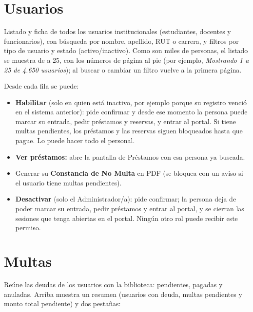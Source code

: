\documentclass[11pt,a4paper]{report}
\begin{document}

\section{Usuarios}


Listado y ficha de todos los usuarios institucionales (estudiantes,
docentes y funcionarios), con búsqueda por nombre, apellido, RUT o
carrera, y filtros por tipo de usuario y estado (activo/inactivo).
Como son miles de personas, el listado se muestra de a 25, con los números
de página al pie (por ejemplo, \emph{Mostrando 1 a 25 de 4.650
usuarios}); al buscar o cambiar un filtro vuelve a la primera página.


Desde cada fila se puede:

\begin{itemize}
  \item \textbf{Habilitar} (solo en quien está inactivo, por ejemplo
  porque su registro venció en el sistema anterior): pide confirmar y desde
  ese momento la persona puede marcar su entrada, pedir préstamos y
  reservas, y entrar al portal. Si tiene multas pendientes, los préstamos y
  las reservas siguen bloqueados hasta que pague. Lo puede hacer todo el
  personal.
  \item \textbf{Ver préstamos:} abre la pantalla de Préstamos con esa
  persona ya buscada.
  \item Generar su \textbf{Constancia de No Multa} en PDF (se bloquea con
  un aviso si el usuario tiene multas pendientes).
  \item \textbf{Desactivar} (solo el Administrador/a): pide confirmar; la
  persona deja de poder marcar su entrada, pedir préstamos y entrar al
  portal, y se cierran las sesiones que tenga abiertas en el portal. Ningún
  otro rol puede recibir este permiso.
\end{itemize}

\section{Multas}
\label{cap:multas}


Reúne las deudas de los usuarios con la biblioteca: pendientes, pagadas y
anuladas. Arriba muestra un resumen (usuarios con deuda, multas
pendientes y monto total pendiente) y dos pestañas:
\end{document}
